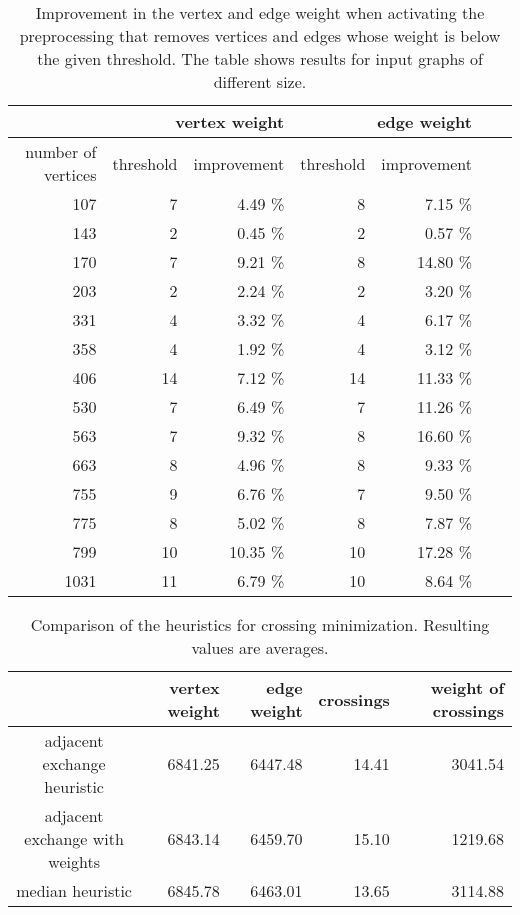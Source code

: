 \documentclass[]{llncs}
\begin{document}
\begin{table}
\centering
    \begin{tabular}{|r|r|r|r|r|r|r|}
		\hline
    ~ & \multicolumn{2}{r|}{vertex weight} &
		\multicolumn{2}{r|}{edge weight} \\
    \hline
		number of vertices & threshold & improvement & threshold &
		improvement \\
    \hline
		107 & 7 & 4.49 \% & 8 & 7.15 \% \\
    143 & 2 & 0.45 \% & 2 & 0.57 \% \\
    170 & 7 & 9.21 \% & 8 & 14.80 \% \\
		203 & 2 & 2.24 \% & 2 & 3.20 \% \\
		331 & 4 & 3.32 \% & 4 & 6.17 \% \\
		358 & 4 & 1.92 \% & 4 & 3.12 \% \\
		406 & 14 & 7.12 \% & 14 & 11.33 \% \\
		530 & 7 & 6.49 \% & 7 & 11.26 \% \\
    563 & 7 & 9.32 \% & 8 & 16.60 \% \\
    663 & 8 & 4.96 \% & 8 & 9.33 \% \\
		755 & 9 & 6.76 \% & 7 & 9.50 \% \\
		775 & 8 & 5.02 \% & 8 & 7.87 \% \\
		799 & 10 & 10.35 \% & 10 & 17.28 \% \\
		1031 & 11 & 6.79 \% & 10 & 8.64 \% \\
		\hline
    \end{tabular}

  \smallskip

\caption{Improvement in the vertex and edge weight when activating the
preprocessing that removes vertices and edges whose weight is below
the given threshold. The table shows results for input graphs of
different size.}
\label{tab:schrankenwerte}
\end{table}

\begin{table}
  \centering
    \begin{tabular}{|c|r|r|r|r|}
    \hline
    ~& vertex weight & edge weight & crossings & weight of crossings \\
    \hline
    adjacent exchange heuristic & 6841.25 & 6447.48  & 14.41 & 3041.54 \\
    adjacent exchange with weights & 6843.14 & 6459.70 & 15.10 & 1219.68 \\
    median heuristic & 6845.78 & 6463.01 & 13.65 & 3114.88 \\
    \hline
    \end{tabular}

  \smallskip

	\caption{Comparison of the heuristics for crossing minimization.
	Resulting values are averages.}
  \label{tab:krMin}
\end{table}
\end{document}
